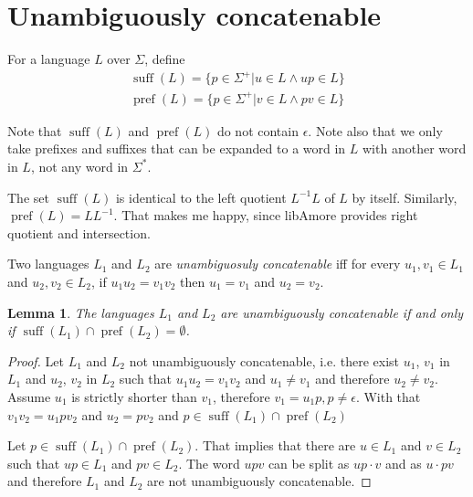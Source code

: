 \documentclass{amsart}
\newcommand{\ensmath}[1]{\ensuremath{#1}\xspace}
\newcommand{\suff}{\ensmath{\operatorname{suff}}}
\newcommand{\pref}{\ensmath{\operatorname{pref}}}
\newcommand{\eps}{\ensmath{\epsilon}}
\newcommand{\conc}[2]{\ensmath{#1\cdot #2}}
\newtheorem{lemma}[theorem]{Lemma}
{\theoremstyle{definition} 
  \newtheorem{defn}{Definition}
  \newtheorem*{remark}{Remark}
  \newtheorem*{example}{Example}}
\begin{document}
\section*{Unambiguously concatenable}

\begin{defn}
  For a language $L$ over $\Sigma$, define
  \begin{equation*}
    \begin{split}
      \suff(L) = \{ p \in \Sigma^+ | u \in L \wedge up \in L \}\\
      \pref(L) = \{ p \in \Sigma^+ | v \in L \wedge pv \in L \}
    \end{split}
  \end{equation*}
\end{defn}
Note that $\suff(L)$ and $\pref(L)$ do not contain $\eps$. Note also that
we only take prefixes and suffixes that can be expanded to a word in $L$
with another word in $L$, not any word in $\Sigma^*$.

The set $\suff(L)$ is identical to the left quotient $L^{-1}L$ of $L$ by
itself. Similarly, $\pref(L) = LL^{-1}$. That makes me happy, since
libAmore provides right quotient and intersection.

\begin{defn}
Two languages $L_1$ and $L_2$ are \emph{unambiguosuly concatenable} iff for
every $u_1, v_1 \in L_1$ and $u_2, v_2 \in L_2$, if $u_1u_2=v_1v_2$ then
$u_1=v_1$ and $u_2=v_2$.
\end{defn}

\begin{lemma}
  The languages $L_1$ and $L_2$ are unambiguously concatenable if and only
  if $\suff(L_1) \cap \pref(L_2) = \emptyset$.
\end{lemma}
\begin{proof}
Let $L_1$ and $L_2$ not unambiguously concatenable, i.e. there exist $u_1$,
$v_1$ in $L_1$ and $u_2$, $v_2$ in $L_2$ such that $u_1u_2=v_1v_2$ and
$u_1\neq v_1$ and therefore $u_2 \neq v_2$. Assume $u_1$ is strictly
shorter than $v_1$, therefore $v_1 = u_1 p, p \neq \eps$. With that $v_1v_2
= u_1pv_2$ and $u_2 = pv_2$ and $p \in \suff(L_1) \cap \pref(L_2)$

Let $p \in \suff(L_1) \cap \pref(L_2)$. That implies that
there are $u\in L_1$ and $v\in L_2$ such that $up\in L_1$ and $pv\in
L_2$. The word $upv$ can be split as $\conc{up}{v}$ and as $\conc{u}{pv}$
and therefore $L_1$ and $L_2$ are not unambiguously concatenable.
\end{proof}
\end{document}
